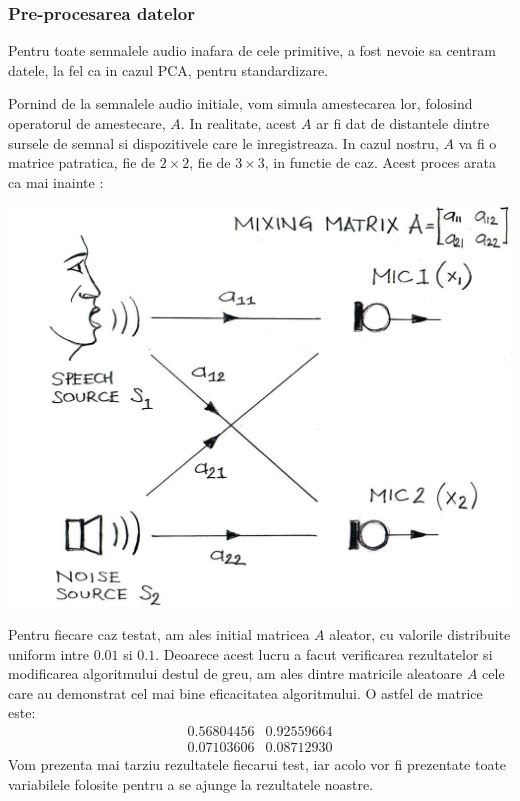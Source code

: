\documentclass[12pt,oneside]{article}
\begin{document}
\subsubsection{Pre-procesarea datelor}
Pentru toate semnalele audio inafara de cele primitive, a fost nevoie sa centram datele, la fel ca in cazul PCA, pentru standardizare. 

Pornind de la semnalele audio initiale, vom simula amestecarea lor, folosind operatorul de amestecare, $A$. In realitate, acest $A$ ar fi dat de distantele dintre sursele de semnal si dispozitivele care le inregistreaza. In cazul nostru, $A$ va fi o matrice patratica, fie de $2 \times 2$, fie de $3 \times 3$, in functie de caz. Acest proces arata ca mai inainte \cite{noise_reduction}:
\begin{center}
	\includegraphics[scale=0.3]{two-sound-sources}
 \end{center}

Pentru fiecare caz testat, am ales initial matricea $A$ aleator, cu valorile distribuite uniform intre $0.01$ si $0.1$. Deoarece acest lucru a facut verificarea rezultatelor si modificarea algoritmului destul de greu, am ales dintre matricile aleatoare $A$ cele care au demonstrat cel mai bine eficacitatea algoritmului. O astfel de matrice este:
\[
 \begin{matrix}
 	0.56804456  & 0.92559664 \\
	0.07103606  & 0.08712930 
 \end{matrix}
\]
Vom prezenta mai tarziu rezultatele fiecarui test, iar acolo vor fi prezentate toate variabilele folosite pentru a se ajunge la rezultatele noastre.
\end{document}
